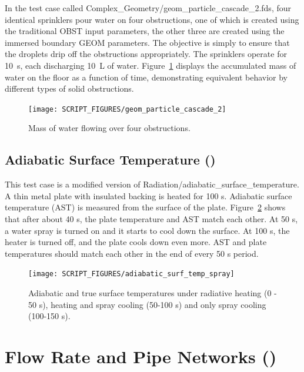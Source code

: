 \documentclass[11pt]{book}
\begin{document}
In the test case called {\ct Complex\_Geometry/geom\_particle\_cascade\_2.fds}, four identical sprinklers pour water on four obstructions, one of which is created using the traditional {\ct OBST} input parameters, the other three are created using the immersed boundary {\ct GEOM} parameters. The objective is simply to ensure that the droplets drip off the obstructions appropriately. The sprinklers operate for 10~s, each discharging 10~L of water. Figure~\ref{geom_particle_cascade_2_fig} displays the accumulated mass of water on the floor as a function of time, demonstrating equivalent behavior by different types of solid obstructions.
\begin{figure}[h!]
\centering
\texttt{[image: SCRIPT\_FIGURES/geom\_particle\_cascade\_2]}
\caption[The {\ct geom\_particle\_cascade\_2} test case]{Mass of water flowing over four obstructions.}
\label{geom_particle_cascade_2_fig}
\end{figure}


\subsection{Adiabatic Surface Temperature (\texorpdfstring{{}}{adiabatic\_surf\_temp\_spray}) }
\label{AST_spray}

This test case is a modified version of {\ct Radiation/adiabatic\_surface\_temperature}. A thin metal plate with insulated backing is heated for 100 s. Adiabatic surface temperature (AST) is measured from the surface of the plate. Figure~\ref{adiabatic_surf_temp_spray} shows that after about 40 s, the plate temperature and AST match each other. At 50 s, a water spray is turned on and it starts to cool down the surface. At 100 s, the heater is turned off, and the plate cools down even more. AST and plate temperatures should match each other in the end of every 50 s period.
\begin{figure}[h!]
\centering
\texttt{[image: SCRIPT\_FIGURES/adiabatic\_surf\_temp\_spray]}
\caption[The {\ct adiabatic\_surface\_temperature\_spray} test case]{Adiabatic and true surface temperatures under radiative heating (0 - 50 s), heating and spray  cooling (50-100 s) and only spray cooling (100-150 s).}
\label{adiabatic_surf_temp_spray}
\end{figure}



\section{Flow Rate and Pipe Networks (\texorpdfstring{{}}{flow\_rate\_2}) }
\label{flow_rate_2}
\end{document}
